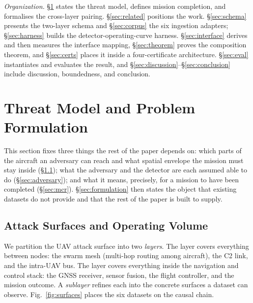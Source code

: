 \emph{Organization.}
\S\ref{sec:problem} states the threat model, defines mission completion, and
formalises the cross-layer pairing. \S\ref{sec:related} positions the work.
\S\ref{sec:schema} presents the two-layer schema and \S\ref{sec:corpus} the six
ingestion adapters; \S\ref{sec:harness} builds the detector-operating-curve
harness. \S\ref{sec:interface} derives and then measures the interface mapping,
\S\ref{sec:theorem} proves the composition theorem, and \S\ref{sec:certs}
places it inside a four-certificate architecture. \S\ref{sec:eval} instantiates
and evaluates the result, and
\S\ref{sec:discussion}--\S\ref{sec:conclusion} include discussion, boundedness, and conclusion. 

\section{Threat Model and Problem Formulation}
\label{sec:problem}
This section fixes three things the rest of the paper depends on: which parts of
the aircraft an adversary can reach and what spatial envelope the mission must
stay inside (\S\ref{sec:surfaces}); what the adversary and the detector are each
assumed able to do (\S\ref{sec:adversary}); and what it means, precisely, for a
mission to have been completed (\S\ref{sec:mcr}). \S\ref{sec:formulation} then
states the object that existing datasets do not provide and that the rest of the
paper is built to supply.

\subsection{Attack Surfaces and Operating Volume}
\label{sec:surfaces}
We partition the UAV attack surface into two \emph{layers}. The \layernet{}
layer covers everything between nodes: the swarm mesh (multi-hop routing among
aircraft), the C2 link, and the intra-UAV bus. The \layerauto{} layer covers
everything inside the navigation and control stack: the GNSS receiver, sensor
fusion, the flight controller, and the mission outcome. A \emph{sublayer}
refines each into the concrete surfaces a dataset can observe.
Fig.~\ref{fig:surfaces} places the six datasets on the causal chain.

